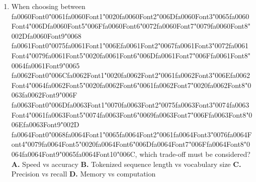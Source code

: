 \documentclass[11pt]{article}
\begin{document}
\begin{enumerate}[leftmargin=*]
  \item When choosing between {\csname fa0060Font0\endcsname\char"0061}{\csname fa0060Font1\endcsname\char"0020}{\csname fa0060Font2\endcsname\char"006D}{\csname fa0060Font3\endcsname\char"0065}{\csname fa0060Font4\endcsname\char"006D}{\csname fa0060Font5\endcsname\char"006F}{\csname fa0060Font6\endcsname\char"0072}{\csname fa0060Font7\endcsname\char"0079}{\csname fa0060Font8\endcsname\char"002D}{\csname fa0060Font9\endcsname\char"0068} {\csname fa0061Font0\endcsname\char"0075}{\csname fa0061Font1\endcsname\char"006E}{\csname fa0061Font2\endcsname\char"0067}{\csname fa0061Font3\endcsname\char"0072}{\csname fa0061Font4\endcsname\char"0079}{\csname fa0061Font5\endcsname\char"0020}{\csname fa0061Font6\endcsname\char"006D}{\csname fa0061Font7\endcsname\char"006F}{\csname fa0061Font8\endcsname\char"0064}{\csname fa0061Font9\endcsname\char"0065} {\csname fa0062Font0\endcsname\char"006C}{\csname fa0062Font1\endcsname\char"0020}{\csname fa0062Font2\endcsname\char"0061}{\csname fa0062Font3\endcsname\char"006E}{\csname fa0062Font4\endcsname\char"0064}{\csname fa0062Font5\endcsname\char"0020}{\csname fa0062Font6\endcsname\char"0061}{\csname fa0062Font7\endcsname\char"0020}{\csname fa0062Font8\endcsname\char"0063}{\csname fa0062Font9\endcsname\char"006F} {\csname fa0063Font0\endcsname\char"006D}{\csname fa0063Font1\endcsname\char"0070}{\csname fa0063Font2\endcsname\char"0075}{\csname fa0063Font3\endcsname\char"0074}{\csname fa0063Font4\endcsname\char"0061}{\csname fa0063Font5\endcsname\char"0074}{\csname fa0063Font6\endcsname\char"0069}{\csname fa0063Font7\endcsname\char"006F}{\csname fa0063Font8\endcsname\char"006E}{\csname fa0063Font9\endcsname\char"002D} {\csname fa0064Font0\endcsname\char"0068}{\csname fa0064Font1\endcsname\char"0065}{\csname fa0064Font2\endcsname\char"0061}{\csname fa0064Font3\endcsname\char"0076}{\csname fa0064Font4\endcsname\char"0079}{\csname fa0064Font5\endcsname\char"0020}{\csname fa0064Font6\endcsname\char"006D}{\csname fa0064Font7\endcsname\char"006F}{\csname fa0064Font8\endcsname\char"0064}{\csname fa0064Font9\endcsname\char"0065}{\csname fa0064Font10\endcsname\char"006C}, which trade-off must be considered?
    \textbf{A.} Speed vs accuracy
    \textbf{B.} Tokenized sequence length vs vocabulary size
    \textbf{C.} Precision vs recall
    \textbf{D.} Memory vs computation

\end{enumerate}
\end{document}
